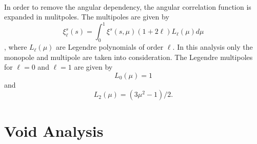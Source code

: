 \\\indent
In order to remove the angular dependency, the angular correlation function is
expanded in mulitpoles. The multipoles are given by 
\begin{equation}
    \xi^s_\ell(s)=\int_0^1\xi^s(s,\mu)(1+2\ell)L_\ell(\mu)d\mu
\end{equation}
\cite{Nadathur_corr}, where $L_\ell(\mu)$ are Legendre polynomials
of order $\ell$. In this analysis only the monopole and multipole
are taken into consideration. The Legendre multipoles for $\ell=0$ and
$\ell=1$ are given by
\begin{equation}
    L_0(\mu)=1
\end{equation}
and
\begin{equation}
    L_2(\mu)=(3\mu^2-1)/2.
\end{equation}
\section{Void Analysis}
